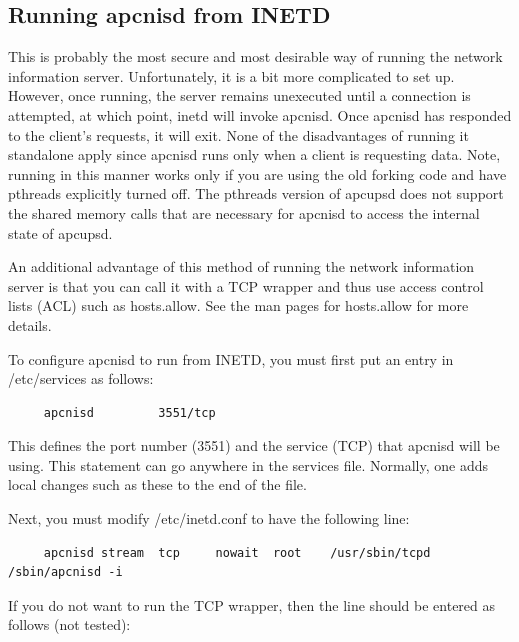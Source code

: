 {{{{{{{{{\label{Running-apcnisd-from-INETD}

\subsection*{Running apcnisd from INETD}

This is probably the most secure and most desirable way of running the network
information server. Unfortunately, it is a bit more complicated to set up.
However, once running, the server remains unexecuted until a connection is
attempted, at which point, inetd will invoke apcnisd. Once apcnisd has
responded to the client's requests, it will exit. None of the disadvantages of
running it standalone apply since apcnisd runs only when a client is
requesting data. Note, running in this manner works only if you are using the
old forking code and have pthreads explicitly turned off. The pthreads version
of apcupsd does not support the shared memory calls that are necessary for
apcnisd to access the internal state of apcupsd.  

An additional advantage of this method of running the network information
server is that you can call it with a TCP wrapper and thus use access control
lists (ACL) such as hosts.allow. See the man pages for hosts.allow for more
details.  

To configure apcnisd to run from INETD, you must first put an entry in
/etc/services as follows: 

\footnotesize
\begin{verbatim}
     apcnisd         3551/tcp
\end{verbatim}
\normalsize

This defines the port number (3551) and the service (TCP) that apcnisd will be
using. This statement can go anywhere in the services file. Normally, one adds
local changes such as these to the end of the file.  

Next, you must modify /etc/inetd.conf to have the following line: 

\footnotesize
\begin{verbatim}
     apcnisd stream  tcp     nowait  root    /usr/sbin/tcpd  /sbin/apcnisd -i
\end{verbatim}
\normalsize

If you do not want to run the TCP wrapper, then the line should be entered as
follows (not tested): 

}}}}}}}}}
